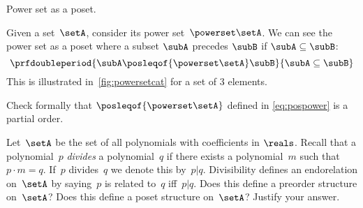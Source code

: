 \begin{marginfigure}
    \centering
    \caption{Power set as a poset.}
    \label{fig:powersetcat}
\end{marginfigure}

\begin{definition}
    \label{ex:hasseinclusion}
    Given a set~$\setA$, consider its power set~$\powerset\setA$.
    We can see the power set as a poset where a subset $\subA$ precedes $\subB$ if $\subA \subseteq \subB$:
    \begin{equation}\label{eq:pospower}
        \prfdoubleperiod{
            \subA \posleqof{\powerset\setA} \subB
        }{
            \subA \subseteq \subB
        }
    \end{equation}
    This is illustrated in~\cref{fig:powersetcat} for a set of 3 elements.
\end{definition}
\begin{exercise}
    Check formally that $\posleqof{\powerset\setA}$ defined in \cref{eq:pospower} is a partial order.
\end{exercise}
\begin{solution}
    \missingsolution
\end{solution}

\vfill
%

\begin{gradedexercise}
    \label{ex:PolynomialDivisibility}
    Let~$\setA$ be the set of all polynomials with coefficients in $\reals$.
    Recall that a polynomial~$p$ \emph{divides} a polynomial~$q$ if there exists a polynomial~$m$ such that~$p \cdot m = q$.
    If~$p$ divides~$q$ we denote this by~$p \vert q$.
    Divisibility defines an endorelation on~$\setA$ by saying~$p$ is related to~$q$ iff~$p \vert q$.
    Does this define a preorder structure on~$\setA$?
    Does this define a poset structure on~$\setA$?
    Justify your answer.
\end{gradedexercise}


